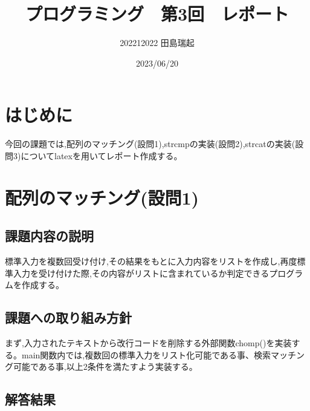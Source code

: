 \documentclass[fontsize = 10pt, paper= a4,twocolumn,column_gap=3zw]{jlreq}
\begin{document}
\title{プログラミング　第3回　レポート}
\author{202212022 田島瑞起}
\date{2023/06/20}
\maketitle

\section{はじめに}
今回の課題では,配列のマッチング(設問1),strcmpの実装(設問2),strcatの実装(設問3)についてlatexを用いてレポート作成する。
\section{配列のマッチング(設問1)}
\subsection{課題内容の説明}
標準入力を複数回受け付け,その結果をもとに入力内容をリストを作成し,再度標準入力を受け付けた際,その内容がリストに含まれているか判定できるプログラムを作成する。
\subsection{課題への取り組み方針}
まず,入力されたテキストから改行コードを削除する外部関数chomp()を実装する。main関数内では,複数回の標準入力をリスト化可能である事、検索マッチング可能である事,以上2条件を満たすよう実装する。
\subsection{解答結果}
\end{document}
